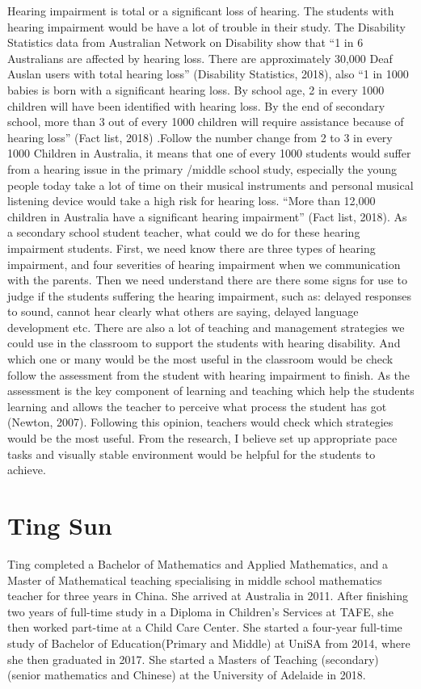 \documentclass[twoside,12pt,a4paper,notitlepage]{memoir}
\begin{document}
Hearing impairment is total or a significant loss of hearing. The students with hearing impairment would be have a lot of trouble in their study.
The Disability Statistics data from Australian Network on Disability show that “1 in 6 Australians are affected by hearing loss. There are approximately 30,000 Deaf Auslan users with total hearing loss” (Disability Statistics, 2018), also “1 in 1000 babies is born with a significant hearing loss. By school age, 2 in every 1000 children will have been identified with hearing loss. By the end of secondary school, more than 3 out of every 1000 children will require assistance because of hearing loss” (Fact list, 2018) .Follow the number change from 2 to 3 in every 1000 Children in Australia, it means that one of every 1000 students would suffer from a hearing issue in the primary /middle school study, especially the young people today take a lot of time on their musical instruments and personal musical listening device would take a high risk for hearing loss. “More than 12,000 children in Australia have a significant hearing impairment” (Fact list, 2018).
As a secondary school student teacher, what could we do for these hearing impairment students. First, we need know there are three types of hearing impairment, and four severities of hearing impairment when we communication with the parents. Then we need understand there are there some signs for use to judge if the students suffering the hearing impairment, such as: delayed responses to sound, cannot hear clearly what others are saying, delayed language development etc. There are also a lot of teaching and management strategies we could use in the classroom to support the students with hearing disability. And which one or many would be the most useful in the classroom would be check follow the assessment from the student with hearing impairment to finish. As the assessment is the key component of learning and teaching which help the students learning and allows the teacher to perceive what process the student has got (Newton, 2007). Following this opinion, teachers would check which strategies would be the most useful. From the research, I believe set up appropriate pace tasks and visually stable environment would be helpful for the students to achieve.

\section*{Ting Sun}

Ting completed a Bachelor of Mathematics and Applied Mathematics, and a Master of Mathematical teaching specialising in middle school mathematics teacher for three years in China. She arrived at Australia in 2011. After finishing two years of full-time study in a Diploma in Children’s Services at TAFE, she then worked part-time at a Child Care Center. She started a four-year full-time study of Bachelor of Education(Primary and Middle) at UniSA from 2014, where she then graduated in 2017. She started a Masters of Teaching (secondary) (senior mathematics and Chinese) at the University of Adelaide in 2018.
\end{document}
